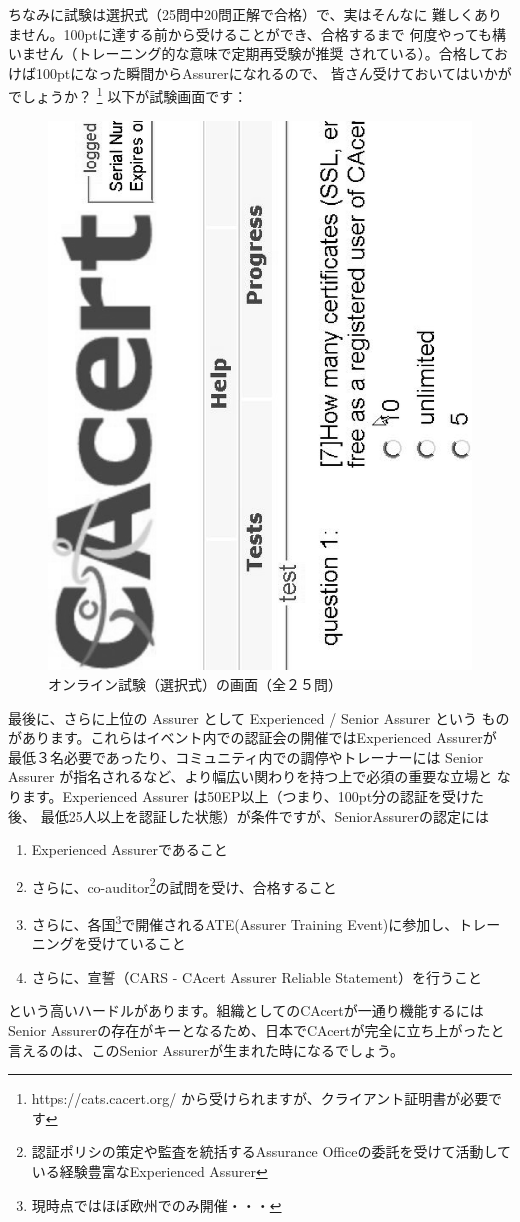 \documentclass[mingoth,a4paper]{jsarticle}
\begin{document}
ちなみに試験は選択式（25問中20問正解で合格）で、実はそんなに
難しくありません。100ptに達する前から受けることができ、合格するまで
何度やっても構いません（トレーニング的な意味で定期再受験が推奨
されている）。合格しておけば100ptになった瞬間からAssurerになれるので、
皆さん受けておいてはいかがでしょうか？
\footnote{https://cats.cacert.org/ から受けられますが、クライアント証明書が必要です}
以下が試験画面です：

\begin{figure}[H]
\begin{center}
\includegraphics[width=0.6\hsize,angle=270]{image201012/cacertcat.eps}
\vspace{1cm}
\caption{オンライン試験（選択式）の画面（全２５問）}
\label{cacertcat}
\end{center}
\end{figure}

最後に、さらに上位の Assurer として Experienced / Senior Assurer という
ものがあります。これらはイベント内での認証会の開催ではExperienced Assurerが
最低３名必要であったり、コミュニティ内での調停やトレーナーには Senior
Assurer が指名されるなど、より幅広い関わりを持つ上で必須の重要な立場と
なります。Experienced Assurer は50EP以上（つまり、100pt分の認証を受けた後、
最低25人以上を認証した状態）が条件ですが、SeniorAssurerの認定には
\begin{enumerate}
\item Experienced Assurerであること
\item さらに、co-auditor\footnote{認証ポリシの策定や監査を統括するAssurance Officeの委託を受けて活動している経験豊富なExperienced Assurer}の試問を受け、合格すること
\item さらに、各国\footnote{現時点ではほぼ欧州でのみ開催・・・}で開催されるATE(Assurer Training Event)に参加し、トレーニングを受けていること
\item さらに、宣誓（CARS - CAcert Assurer Reliable Statement）を行うこと
\end{enumerate}
という高いハードルがあります。組織としてのCAcertが一通り機能するには
Senior Assurerの存在がキーとなるため、日本でCAcertが完全に立ち上がったと
言えるのは、このSenior Assurerが生まれた時になるでしょう。
\end{document}

